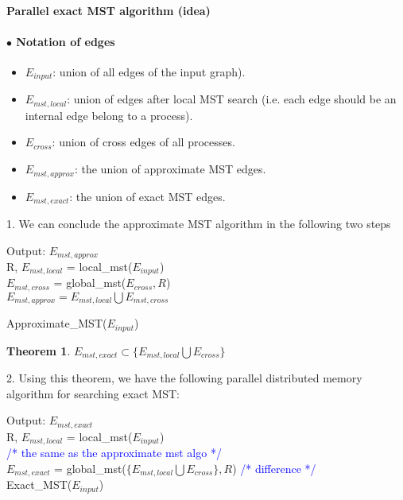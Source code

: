 \documentclass[12pt]{article}
\newtheorem{theorem}{Theorem}[section]
\begin{document}
\paragraph{\large{Parallel exact MST algorithm (idea)}}
\paragraph{$\bullet$ Notation of edges}
    \begin{itemize}
        \item $E_{input}$: union of all edges of the input graph).
        \item $E_{mst,local}$: union of edges after local MST search (i.e. each edge should be an internal edge belong to a process).
        \item $E_{cross}$: union of cross edges of all processes.
        \item $E_{mst,approx}$: the union of approximate MST edges.
        \item $E_{mst,exact}$: the union of exact MST edges.
    \end{itemize}


1. We can conclude the approximate MST algorithm in the following two steps
\begin{algorithm}[!h]
	\DontPrintSemicolon
    Output: $E_{mst,approx}$  \\
        \nl R, $E_{mst,local}$ = local\_mst($E_{input}$)\\
        \nl  $E_{mst,cross}$ = global\_mst($E_{cross}, R$)\\
        \nl $E_{mst,approx} = E_{mst,local} \bigcup E_{mst,cross}$
	\caption{Approximate\_MST($E_{input}$)}
	\label{approxmst}
\end{algorithm}


\begin{theorem}
\label{exact_mst}
$E_{mst,exact}\subset \{ E_{mst,local} \bigcup E_{cross}\}$ 
\end{theorem}

2. Using this theorem, we have the following parallel distributed memory algorithm for searching exact MST:
\begin{algorithm}[!h]
	\DontPrintSemicolon
    Output: $E_{mst,exact}$  \\
        \nl R, $E_{mst,local}$ = local\_mst($E_{input}$)\\ \quad \textcolor{blue}{/*  the same as the approximate mst algo */}\\
        \nl $E_{mst,exact}$ = global\_mst($\{ E_{mst,local} \bigcup E_{cross}\}, R$) \qquad \qquad\textcolor{blue}{/*  difference */}\\
	\caption{Exact\_MST($E_{input}$)}
	\label{exactmst}
\end{algorithm}
\end{document}
